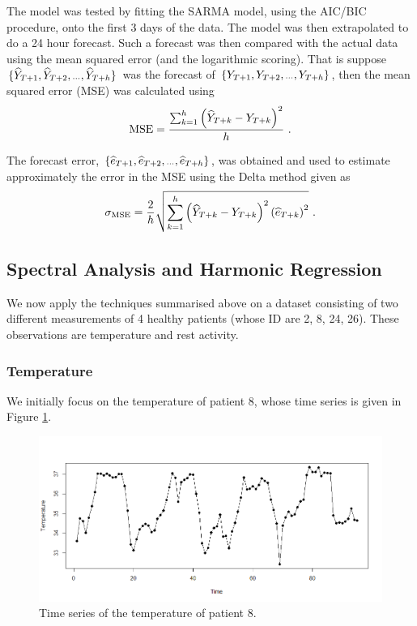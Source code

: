 \documentclass[]{article}
\newcommand{\dotdotdot}{\vphantom{.}_{\cdots}}
\begin{document}
The model was tested by fitting the SARMA model, using the AIC/BIC procedure, onto the first 3 days of the data. The model was then extrapolated to do a 24 hour forecast. Such a forecast was then compared with the actual data using the mean squared error (and the logarithmic scoring). That is suppose $\{\widehat{Y}_{T+1},\widehat{Y}_{T+2},\dotdotdot,\widehat{Y}_{T+h}\}$ was the forecast of $\{{Y}_{T+1},{Y}_{T+2},\dotdotdot,{Y}_{T+h}\}$, then the mean squared error (MSE) was calculated using
\begin{equation}
\textup{MSE} = \frac{\sum_{k=1}^{h}\left(\widehat{Y}_{T+k}-Y_{T+k}\right)^2}{h} \ .
\end{equation}

The forecast error, $\{\widehat{e}_{T+1},\widehat{e}_{T+2},\dotdotdot,\widehat{e}_{T+h}\}$, was obtained and used to estimate approximately the error in the MSE using the Delta method given as
\begin{equation}
\sigma_{\textup{MSE}} = \frac{2}{h}\sqrt{\sum_{k=1}^{h}\left(\widehat{Y}_{T+k}-Y_{T+k}\right)^2\left(\widehat{e}_{T+k}\right)^2} \ .
\end{equation}

\subsection{Spectral Analysis and Harmonic Regression}
We now apply the techniques summarised above on a dataset consisting of two different measurements of 4 healthy patients (whose ID are 2, 8, 24, 26). These observations are temperature and rest activity. 

\subsubsection*{Temperature}
We initially focus on the temperature of patient 8, whose time series is given in Figure \ref{fig:Temp8}.


\begin{figure}[ht]\centering
	\includegraphics[scale = 0.3]{Temp8.png}
	\caption{Time series of the temperature of patient 8.}
	\label{fig:Temp8}
\end{figure}
\end{document}
